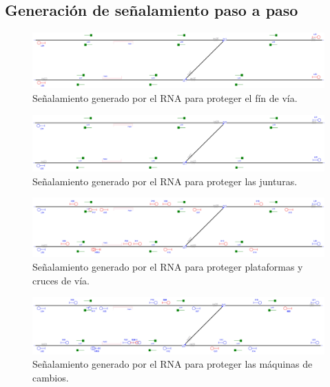 \subsection{Generación de señalamiento paso a paso}

\lipsum[1]

\begin{figure}[H]
	\centering
	\includegraphics[width=1\textwidth]{resultados-obtenidos/ejemplo8/images/8_step1.png}
	\centering\caption{Señalamiento generado por el RNA para proteger el fín de vía.}
\end{figure}

\lipsum[1]

\begin{figure}[H]
	\centering
	\includegraphics[width=1\textwidth]{resultados-obtenidos/ejemplo8/images/8_step2.png}
	\centering\caption{Señalamiento generado por el RNA para proteger las junturas.}
\end{figure}

\lipsum[1]

\begin{figure}[H]
	\centering
	\includegraphics[width=1\textwidth]{resultados-obtenidos/ejemplo8/images/8_step3.png}
	\centering\caption{Señalamiento generado por el RNA para proteger plataformas y cruces de vía.}
\end{figure}

\lipsum[1]

 \begin{figure}[H]
	\centering
	\includegraphics[width=1\textwidth]{resultados-obtenidos/ejemplo8/images/8_step4.png}
	\centering\caption{Señalamiento generado por el RNA para proteger las máquinas de cambios.}
\end{figure}

